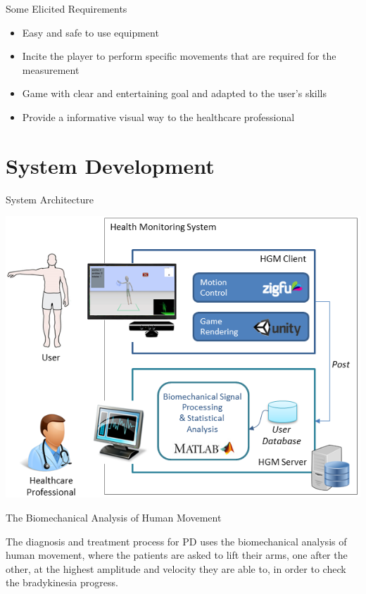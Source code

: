 \documentclass{beamer}
\begin{document}
\begin{frame}{Some Elicited Requirements}
	\begin{block}{}
		\begin{itemize}[<+->]
			\item	Easy and safe to use equipment
      \item Incite the player to perform specific movements that are required for the measurement 
      \item Game with clear and entertaining goal and adapted to the user's skills
			\item Provide a informative visual way to the healthcare professional
		\end{itemize}
	\end{block}
\end{frame}




\section{System Development}

\begin{frame}{System Architecture}
		 \begin{block}{}
			\begin{center}
				\includegraphics[height=2.2 in]{img/systemarchitecture3.png}
			\end{center}
		 \end{block}
\end{frame}


\begin{frame}{The Biomechanical Analysis of Human Movement}
  \begin{block}{}
   The diagnosis and treatment process for PD uses the biomechanical analysis of human movement, where the patients are asked to lift their arms, one after the other, at the highest amplitude and velocity they are able to, in order to check the bradykinesia progress. 
  \end{block}
\end{frame}
\end{document}
